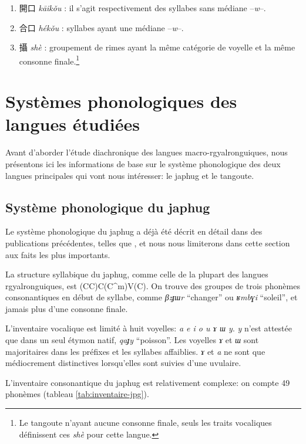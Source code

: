 \documentclass[oldfontcommands,twoside,a4paper,11pt,draft]{memoir}
\newcommand{\zh}[1]{{\cn #1}}
\begin{document}
\begin{enumerate}
\item \zh{開口} \textit{kāikǒu} : il s'agit respectivement des syllabes sans médiane --\textit{w}--.
\item \zh{合口} \textit{hékǒu} : syllabes ayant une  médiane --\textit{w}--.
\item \zh{攝} \textit{shè} : groupement de rimes ayant la même catégorie de voyelle et la même consonne finale.\footnote{Le tangoute n'ayant aucune consonne finale, seuls les traits vocaliques définissent ces \textit{shè} pour cette langue. }

\end{enumerate}

\section{Systèmes phonologiques des langues étudiées}
Avant d'aborder l'étude diachronique des langues macro-rgyalronguiques, nous présentons ici les informations de base sur le système phonologique des deux langues principales qui vont nous intéresser: le japhug et le tangoute.

 \subsection{Système phonologique du japhug}
Le  système phonologique du japhug a déjà été décrit en détail dans des publications précédentes, telles que \citet{jacques08}, et nous nous limiterons dans cette section aux faits les plus importants.

La structure syllabique du japhug, comme celle de la plupart des langues rgyalronguiques, est (CC)C(C^m)V(C). On trouve des groupes de trois phonèmes consonantiques en début de syllabe, comme \textit{βzɟɯr} ``changer'' ou \textit{ʁmbɣi} ``soleil'', et jamais plus d'une consonne finale. 

L'inventaire vocalique est limité à huit voyelles: \textit{a e i o u ɤ ɯ y}. \textit{y} n'est attestée que dans un seul étymon natif, \textit{qaɟy} ``poisson''. Les voyelles \textit{ɤ} et \textit{ɯ} sont majoritaires dans les préfixes et les syllabes affaiblies. \textit{ɤ} et \textit{a} ne sont que médiocrement distinctives lorsqu'elles sont suivies d'une uvulaire.

L'inventaire consonantique du japhug est relativement complexe: on compte 49 phonèmes (tableau \ref{tab:inventaire-jpg}).
\end{document}
